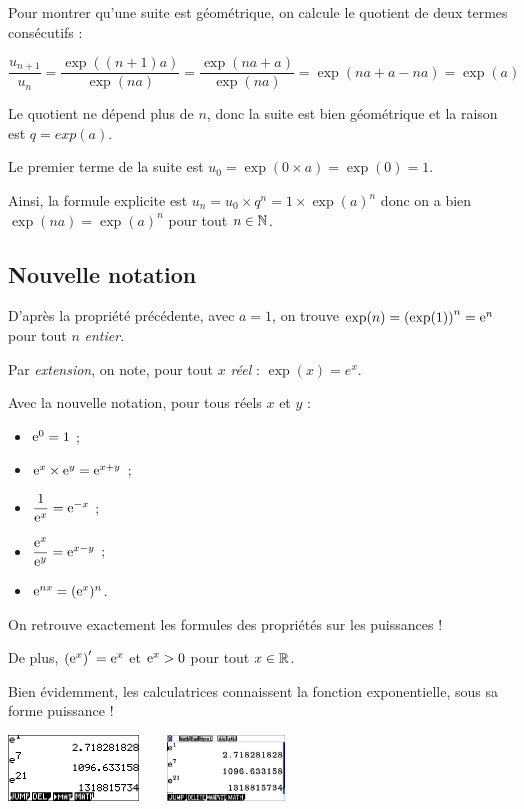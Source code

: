 \documentclass[a4paper,11pt]{article}
\begin{document}
\begin{cdemo}
Pour montrer qu'une suite est géométrique, on calcule le quotient de deux termes consécutifs : 

\tabula{}$\dfrac{u_{n+1}}{u_n}=\dfrac{\exp((n+1)a)}{\exp(na)}=\dfrac{\exp(na+a)}{\exp(na)}=\exp(na+a-na)=\exp(a)$

Le quotient ne dépend plus de $n$, donc la suite est bien géométrique et la raison est $q=exp(a)$.

Le premier terme de la suite est $u_0=\exp(0 \times a)=\exp(0)=1$.

Ainsi, la formule explicite est $u_n=u_0 \times q^n=1 \times \exp(a)^n$ donc on a bien $\exp(na)=\exp(a)^n$ pour tout $n \in \N$.
\end{cdemo}

\subsection{Nouvelle notation}

\begin{cintro}
D'après la propriété précédente, avec $a=1$, on trouve $\exp(n)=\left(\exp(1)\right)^n={\rm e}^n$ pour tout $n$ \textit{entier}.
\end{cintro}

\begin{cnota}
Par \textit{extension}, on note, pour tout $x$ \textit{réel} : $\exp(x)=e^x$.
\end{cnota}

\begin{cprop}[s]
Avec la nouvelle notation, pour tous réels $x$ et $y$ :
\begin{itemize}[]
	\item ${\rm e}^0=1$ ;
	\item ${\rm e}^x \times {\rm e}^y = {\rm e}^{x+y}$ ;
	\item $\dfrac{1}{{\rm e}^x}={\rm e}^{-x}$ ;
	\item $\dfrac{{\rm e}^x}{{\rm e}^y}={\rm e}^{x-y}$ ;
	\item ${\rm e}^{nx}=({\rm e}^x)^n$.
\end{itemize}
On retrouve exactement les formules des propriétés sur les puissances !

De plus, $\left({\rm e}^x\right)'={\rm e}^x$ et ${\rm e}^x>0$ pour tout $x\in \R$.
\end{cprop}

\begin{ccalco}
Bien évidemment, les calculatrices \og connaissent \fg{} la fonction exponentielle, sous sa forme \og puissance \fg{} !
\begin{center}
	\includegraphics[height=1.75cm]{chap13_expo_casio35}~~~~\includegraphics[height=1.75cm]{chap13_expo_casio90}
\end{center}
\end{ccalco}
\end{document}
